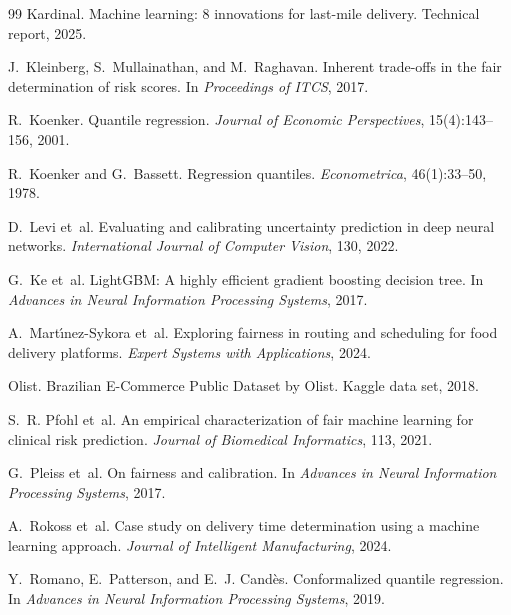 \documentclass[12pt]{article}
\begin{document}
\begin{thebibliography}{99}
Kardinal.
\newblock Machine learning: 8 innovations for last-mile delivery.
\newblock Technical report, 2025.

J.~Kleinberg, S.~Mullainathan, and M.~Raghavan.
\newblock Inherent trade-offs in the fair determination of risk scores.
\newblock In \emph{Proceedings of ITCS}, 2017.

R.~Koenker.
\newblock Quantile regression.
\newblock \emph{Journal of Economic Perspectives}, 15(4):143--156, 2001.

R.~Koenker and G.~Bassett.
\newblock Regression quantiles.
\newblock \emph{Econometrica}, 46(1):33--50, 1978.

D.~Levi et~al.
\newblock Evaluating and calibrating uncertainty prediction in deep neural networks.
\newblock \emph{International Journal of Computer Vision}, 130, 2022.

G.~Ke et~al.
\newblock LightGBM: A highly efficient gradient boosting decision tree.
\newblock In \emph{Advances in Neural Information Processing Systems}, 2017.

A.~Mart{\'\i}nez-Sykora et~al.
\newblock Exploring fairness in routing and scheduling for food delivery platforms.
\newblock \emph{Expert Systems with Applications}, 2024.

Olist.
\newblock Brazilian E-Commerce Public Dataset by Olist.
\newblock Kaggle data set, 2018.

S.~R. Pfohl et~al.
\newblock An empirical characterization of fair machine learning for clinical risk prediction.
\newblock \emph{Journal of Biomedical Informatics}, 113, 2021.

G.~Pleiss et~al.
\newblock On fairness and calibration.
\newblock In \emph{Advances in Neural Information Processing Systems}, 2017.

A.~Rokoss et~al.
\newblock Case study on delivery time determination using a machine learning approach.
\newblock \emph{Journal of Intelligent Manufacturing}, 2024.

Y.~Romano, E.~Patterson, and E.~J. Cand{\`e}s.
\newblock Conformalized quantile regression.
\newblock In \emph{Advances in Neural Information Processing Systems}, 2019.


\end{thebibliography}
\end{document}

